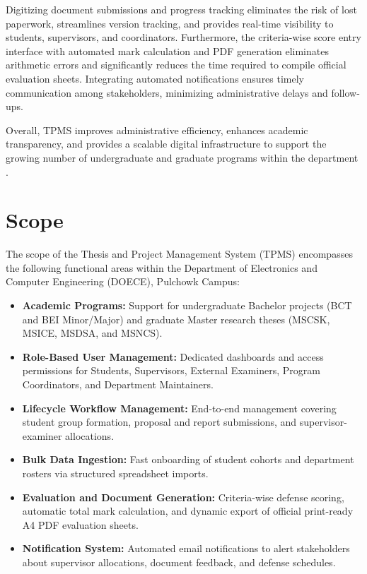 \documentclass[12pt,a4paper]{report}
\begin{document}
Digitizing document submissions and progress tracking eliminates the risk of lost paperwork, streamlines version tracking, and provides real-time visibility to students, supervisors, and coordinators. Furthermore, the criteria-wise score entry interface with automated mark calculation and PDF generation eliminates arithmetic errors and significantly reduces the time required to compile official evaluation sheets. Integrating automated notifications ensures timely communication among stakeholders, minimizing administrative delays and follow-ups.

Overall, TPMS improves administrative efficiency, enhances academic transparency, and provides a scalable digital infrastructure to support the growing number of undergraduate and graduate programs within the department \cite{sommerville2016software}.

\section{Scope}
The scope of the Thesis and Project Management System (TPMS) encompasses the following functional areas within the Department of Electronics and Computer Engineering (DOECE), Pulchowk Campus:

\begin{itemize}
  \item \textbf{Academic Programs:} Support for undergraduate Bachelor projects (BCT and BEI Minor/Major) and graduate Master research theses (MSCSK, MSICE, MSDSA, and MSNCS).
  
  \item \textbf{Role-Based User Management:} Dedicated dashboards and access permissions for Students, Supervisors, External Examiners, Program Coordinators, and Department Maintainers.
  
  \item \textbf{Lifecycle Workflow Management:} End-to-end management covering student group formation, proposal and report submissions, and supervisor-examiner allocations.
  
  \item \textbf{Bulk Data Ingestion:} Fast onboarding of student cohorts and department rosters via structured spreadsheet imports.
  
  \item \textbf{Evaluation and Document Generation:} Criteria-wise defense scoring, automatic total mark calculation, and dynamic export of official print-ready A4 PDF evaluation sheets.
  
  \item \textbf{Notification System:} Automated email notifications to alert stakeholders about supervisor allocations, document feedback, and defense schedules.
\end{itemize}
\end{document}
